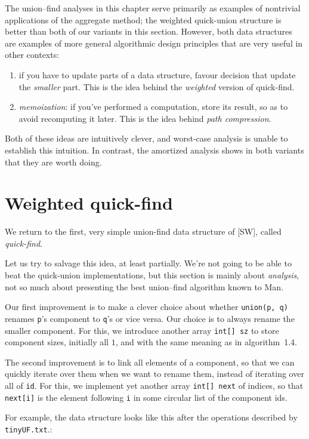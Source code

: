 \documentclass{tstextbook}
\begin{document}
The union--find analyses in this chapter serve primarily as examples of nontrivial applications of the aggregate method; the weighted quick-union structure is better than both of our variants in this section.
However, both data structures are examples of more general algorithmic design principles that are very useful in other contexts:
\begin{enumerate}
  \item if you have to update parts of a data structure, favour decision that update the \emph{smaller} part.
    This is the idea behind the \emph{weighted} version of quick-find.
  \item \emph{memoization}: if you've performed a computation, store its result, so as to avoid recomputing it later.
    This is the idea behind \emph{path compression}.
\end{enumerate}

Both of these ideas are intuitively clever, and worst-case analysis is unable to establish this intuition.
In contrast, the amortized analysis shows in both variants that they are worth doing.

\section{Weighted quick-find}

We return to the first, very simple union-find data structure of [SW],
called \emph{quick-find}. 

Let us try to salvage this idea, at least partially. We're not going
to be able to beat the quick-union implementations, but this section
is mainly about \emph{analysis}, not so much about presenting the best
union--find algorithm known to Man.

Our first improvement is to make a clever choice about whether
\texttt{union(p, q)} renames {\tt p}'s component to {\tt q}'s or vice
versa. 
Our choice is to always rename the smaller component.
For this, we introduce another array {\tt int[] sz} to store component sizes, initially all $1$, and with the same meaning as in algorithm~1.4.

The second improvement is to link all elements of a component, so that we can quickly iterate over them when we want to rename them, instead of iterating over all of {\tt id}.
For this, we implement yet another array {\tt int[] next} of indices,
so that {\tt next[i]} is the element following {\tt i} in some
circular list of the component ids.

For example, the data structure looks like this after the operations
described by {\tt tinyUF.txt}.:
\end{document}
